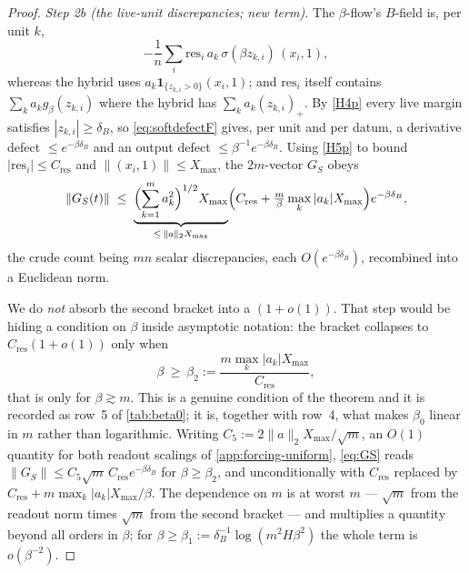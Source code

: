\documentclass[11pt]{article}
\theoremstyle{definition}
\theoremstyle{remark}
\newcommand{\res}{\mathrm{res}}
\begin{document}
\begin{proof}
\emph{Step 2b (the live-unit discrepancies; new term).} The $\beta$-flow's
$B$-field is, per unit $k$,
\[
-\frac1n\sum_i\res_i\,a_k\,\sigma(\beta z_{k,i})\,(x_i,1),
\]
whereas the hybrid uses $a_k\mathbf 1_{\{z_{k,i}>0\}}(x_i,1)$; and $\res_i$
itself contains $\sum_ka_kg_\beta(z_{k,i})$ where the hybrid has
$\sum_ka_k(z_{k,i})_+$. By \eqref{H4p} every live margin satisfies
$|z_{k,i}|\ge\delta_B$, so \eqref{eq:softdefectF} gives, per unit and per datum,
a derivative defect $\le e^{-\beta\delta_B}$ and an output defect
$\le\beta^{-1}e^{-\beta\delta_B}$. Using \eqref{H5p} to bound $|\res_i|\le
C_{\mathrm{res}}$ and $\|(x_i,1)\|\le X_{\max}$, the $2m$-vector $G_S$ obeys
\begin{equation}\label{eq:GS}
\|G_S(t)\|\;\le\;
\underbrace{\Bigl(\sum_{k=1}^m a_k^2\Bigr)^{1/2}X_{\max}}_{\le\,\|a\|_2X_{\max}}
\Bigl(C_{\mathrm{res}}+\tfrac{m}{\beta}\max_k|a_k|X_{\max}\Bigr)e^{-\beta\delta_B},
\end{equation}
the crude count being $mn$ scalar discrepancies, each $O(e^{-\beta\delta_B})$,
recombined into a Euclidean norm.

We do \emph{not} absorb the second bracket into a $(1+o(1))$. That step would be
hiding a condition on $\beta$ inside asymptotic notation: the bracket collapses
to $C_{\mathrm{res}}(1+o(1))$ only when
\begin{equation}\label{eq:beta2}
\beta\ \ge\ \beta_2:=\frac{m\max_k|a_k|X_{\max}}{C_{\mathrm{res}}},
\end{equation}
that is only for $\beta\gtrsim m$. This is a genuine condition of the theorem
and it is recorded as row~5 of \cref{tab:beta0}; it is, together with row~4,
what makes $\beta_0$ linear in $m$ rather than logarithmic. Writing
$C_5:=2\|a\|_2X_{\max}/\sqrt m$, an $O(1)$ quantity for both readout scalings of
\cref{app:forcing-uniform}, \eqref{eq:GS} reads
$\|G_S\|\le C_5\sqrt m\,C_{\mathrm{res}}e^{-\beta\delta_B}$ for
$\beta\ge\beta_2$, and unconditionally with $C_{\mathrm{res}}$ replaced by
$C_{\mathrm{res}}+m\max_k|a_k|X_{\max}/\beta$. The dependence on $m$ is at worst
$m$ --- $\sqrt m$ from the readout norm times $\sqrt m$ from the second bracket
--- and multiplies a quantity beyond all orders in $\beta$; for
$\beta\ge\beta_1:=\delta_B^{-1}\log(m^2 H\beta^2)$ the whole term is
$o(\beta^{-2})$.


\end{proof}
\end{document}
